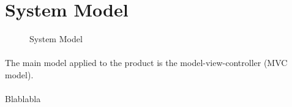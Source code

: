 \section{System Model}

\begin{figure}[h!]
\centering
\caption{System Model}
\end{figure}

\paragraph{}The main model applied to the product is the
model-view-controller (MVC model).

\paragraph{}Blablabla